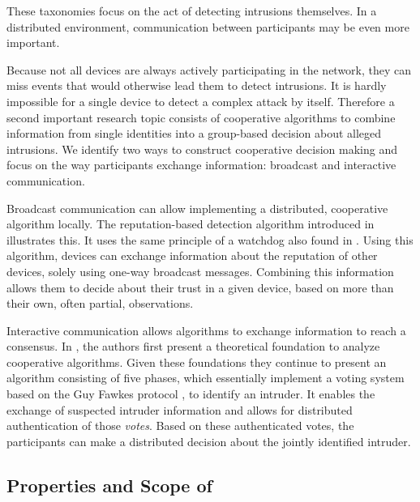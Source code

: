 \documentclass[conference]{IEEEtran}
\begin{document}
These taxonomies focus on the act of detecting intrusions themselves. In a
distributed environment, communication between participants may be even more
important.

Because not all devices are always actively participating in the network, they
can miss events that would otherwise lead them to detect intrusions. It is
hardly impossible for a single device to detect a complex attack by itself.
Therefore a second important research topic consists of cooperative algorithms
to combine information from single identities into a group-based decision about
alleged intrusions. We identify two ways to construct cooperative decision
making and focus on the way participants exchange information: broadcast and
interactive communication.

\begin{LaTeXdescription}

  \item[Broadcast communication] can allow implementing a distributed,
  cooperative algorithm locally. The reputation-based detection algorithm
  introduced in \cite{ganeriwal2008reputation} illustrates this. It uses the
  same principle of a watchdog also found in \cite{mishra2004intrusion}. Using
  this algorithm, devices can exchange information about the reputation of
  other devices, solely using one-way broadcast messages. Combining this
  information allows them to decide about their trust in a given device, based
  on more than their own, often partial, observations.

  \item[Interactive communication] allows algorithms to exchange information to
  reach a consensus. In \cite{krontiris2009cooperative}, the authors first
  present a theoretical foundation to analyze cooperative algorithms. Given
  these foundations they continue to present an algorithm consisting of five
  phases, which essentially implement a voting system based on the Guy Fawkes
  protocol \cite{anderson1998new}, to identify an intruder. It enables the
  exchange of suspected intruder information and allows for distributed
  authentication of those \emph{votes}. Based on these authenticated votes, the
  participants can make a distributed decision about the jointly identified
  intruder.

\end{LaTeXdescription}

\subsection{Properties and Scope of \NAME}
\label{scope}
\end{document}
